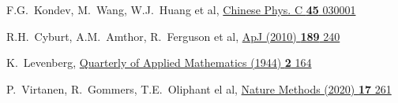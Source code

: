 \begin{thebibliography}{9}
 F.G.~Kondev, M.~Wang, W.J.~Huang et al,
 \href{https://doi.org/10.1088/1674-1137/abddae}{Chinese Phys. C \textbf{45} 030001}

R.H.~Cyburt, A.M.~Amthor, R.~Ferguson et al,
\href{https://doi.org/10.1088/0067-0049/189/1/240}
  {ApJ (2010) \textbf{189} 240}

K.~Levenberg,
\href{https://doi.org/10.1090/qam/10666}
  {Quarterly of Applied Mathematics (1944) \textbf{2} 164}

P.~Virtanen, R.~Gommers, T.E.~Oliphant el al,
\href{https://doi.org/10.1038/s41592-019-0686-2}
  {Nature Methods (2020) \textbf{17} 261}
\end{thebibliography}
